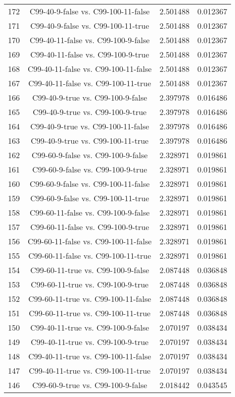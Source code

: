 \documentclass[a4paper,10pt]{article}
\begin{document}
\begin{landscape}
\begin{table}[!htp]
\begin{tabular}{cccc}
172&C99-40-9-false vs. C99-100-11-false&2.501488&0.012367\\
171&C99-40-9-false vs. C99-100-11-true&2.501488&0.012367\\
170&C99-40-11-false vs. C99-100-9-false&2.501488&0.012367\\
169&C99-40-11-false vs. C99-100-9-true&2.501488&0.012367\\
168&C99-40-11-false vs. C99-100-11-false&2.501488&0.012367\\
167&C99-40-11-false vs. C99-100-11-true&2.501488&0.012367\\
166&C99-40-9-true vs. C99-100-9-false&2.397978&0.016486\\
165&C99-40-9-true vs. C99-100-9-true&2.397978&0.016486\\
164&C99-40-9-true vs. C99-100-11-false&2.397978&0.016486\\
163&C99-40-9-true vs. C99-100-11-true&2.397978&0.016486\\
162&C99-60-9-false vs. C99-100-9-false&2.328971&0.019861\\
161&C99-60-9-false vs. C99-100-9-true&2.328971&0.019861\\
160&C99-60-9-false vs. C99-100-11-false&2.328971&0.019861\\
159&C99-60-9-false vs. C99-100-11-true&2.328971&0.019861\\
158&C99-60-11-false vs. C99-100-9-false&2.328971&0.019861\\
157&C99-60-11-false vs. C99-100-9-true&2.328971&0.019861\\
156&C99-60-11-false vs. C99-100-11-false&2.328971&0.019861\\
155&C99-60-11-false vs. C99-100-11-true&2.328971&0.019861\\
154&C99-60-11-true vs. C99-100-9-false&2.087448&0.036848\\
153&C99-60-11-true vs. C99-100-9-true&2.087448&0.036848\\
152&C99-60-11-true vs. C99-100-11-false&2.087448&0.036848\\
151&C99-60-11-true vs. C99-100-11-true&2.087448&0.036848\\
150&C99-40-11-true vs. C99-100-9-false&2.070197&0.038434\\
149&C99-40-11-true vs. C99-100-9-true&2.070197&0.038434\\
148&C99-40-11-true vs. C99-100-11-false&2.070197&0.038434\\
147&C99-40-11-true vs. C99-100-11-true&2.070197&0.038434\\
146&C99-60-9-true vs. C99-100-9-false&2.018442&0.043545\\

\end{tabular}
\end{table}
\end{landscape}
\end{document}
